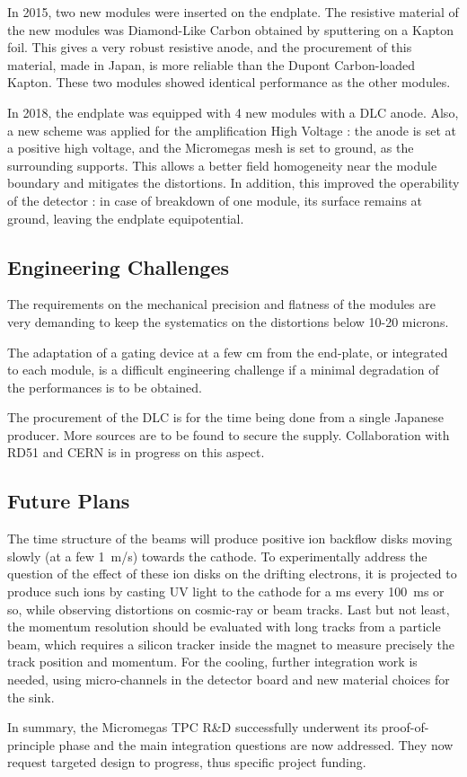 In 2015, two new modules were inserted on the endplate. The resistive material of the new
modules was Diamond-Like Carbon obtained by sputtering on a Kapton foil.
This gives a very robust resistive anode, and the procurement of this material, made in Japan, is more reliable
than the Dupont Carbon-loaded Kapton. These two modules showed identical performance as the other modules.

In 2018, the endplate was equipped with 4 new modules with a DLC anode. Also, a new scheme was applied for the amplification High Voltage : the anode is set at a positive high voltage, and the Micromegas mesh is set to ground, as the surrounding supports. This allows a better field homogeneity near the module boundary and mitigates the distortions. In addition, this improved the operability of the detector : in case of breakdown of one module, its surface remains at ground, leaving the endplate equipotential. 

\subsection{Engineering Challenges}

The requirements on the mechanical precision and flatness of the modules are very demanding to keep the systematics on the distortions below 10-20 microns.  

The adaptation of a gating device at a few cm from the end-plate, or integrated to each module, is a
difficult engineering challenge if a minimal degradation of the performances is to be obtained.

The procurement of the DLC is for the time being done from a single Japanese producer. More sources are to be found to secure the supply. Collaboration with RD51 and CERN is in progress on this aspect. 

\subsection{Future Plans}
The time structure of the beams will produce positive ion backflow disks moving slowly (at a few \SI{1}{m/s}) towards the cathode. To experimentally address the question of the effect of these ion disks on the drifting electrons, it is projected to produce such
ions by casting UV light to the cathode for a ms every \SI{100}{ms} or so, while observing distortions on cosmic-ray or beam tracks.
Last but not least, the momentum resolution should be evaluated with long tracks from a particle beam, which requires a silicon
tracker inside the magnet to measure precisely the track position and momentum. For the cooling, further integration work is needed, using micro-channels in the detector board and new material choices for the sink.

In summary, the Micromegas TPC R\&D successfully underwent its proof-of-principle phase and the main integration questions are now addressed. They now request targeted design to progress, thus specific project funding.
